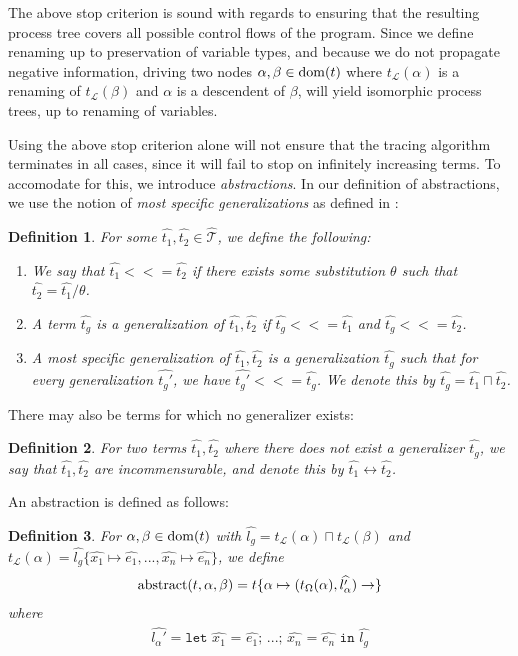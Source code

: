 \documentclass[10pt]{../sigplanconf}
\newcommand{\dom}{\ensuremath{{\rm dom}}}
\newtheorem{definition}{Definition}
\begin{document}
The above stop criterion is sound with regards to ensuring that the
resulting process tree covers all possible control flows of the
program. Since we define renaming up to preservation of variable
types, and because we do not propagate negative information, driving
two nodes $\alpha, \beta \in \dom(t)$ where $t_\mathcal{L}(\alpha)$ is
a renaming of $t_\mathcal{L}(\beta)$ and $\alpha$ is a descendent of
$\beta$, will yield isomorphic process trees, up to renaming of
variables.

Using the above stop criterion alone will not ensure that the tracing
algorithm terminates in all cases, since it will fail to stop on
infinitely increasing terms. To accomodate for this, we introduce
\emph{abstractions}. In our definition of abstractions, we use the
notion of \emph{most specific generalizations} as defined in
\cite{sorensen1998introduction}:
\begin{definition}
  For some $\widehat{t_1},\widehat{t_2} \in \widehat{\mathcal{T}}$, we
  define the following:
  \begin{enumerate}
  \item We say that $\widehat{t_1} <<= \widehat{t_2}$ if there exists
    some substitution $\theta$ such that $\widehat{t_2} =
    \widehat{t_1}/\theta$.
  \item A term $\widehat{t_g}$ is a \emph{generalization} of
    $\widehat{t_1},\widehat{t_2}$ if $\widehat{t_g} <<= \widehat{t_1}$
    and $\widehat{t_g} <<= \widehat{t_2}$.
  \item A \emph{most specific generalization} of $\widehat{t_1},
    \widehat{t_2}$ is a generalization $\widehat{t_g}$ such that for
    every generalization $\widehat{t_g'}$, we have $\widehat{t_g'} <<=
    \widehat{t_g}$. We denote this by $\widehat{t_g} = \widehat{t_1}
    \sqcap \widehat{t_2}$.
  \end{enumerate}
\end{definition}
There may also be terms for which no generalizer exists:
\begin{definition}
  For two terms $\widehat{t_1},\widehat{t_2}$ where there does not
  exist a generalizer $\widehat{t_g}$, we say that
  $\widehat{t_1},\widehat{t_2}$ are \emph{incommensurable}, and denote
  this by $\widehat{t_1} \leftrightarrow \widehat{t_2}$.
\end{definition}
An abstraction is defined as follows:
\begin{definition}
  For $\alpha, \beta \in \dom(t)$ with $\widehat{l_g} =
  t_\mathcal{L}(\alpha) \sqcap t_\mathcal{L}(\beta)$ and
  $t_\mathcal{L}(\alpha) = \widehat{l_g} \{ \widehat{x_1} \mapsto
  \widehat{e_1}, ..., \widehat{x_n} \mapsto \widehat{e_n} \}$, we
  define
\begin{align*}
{\rm abstract}(t,\alpha,\beta) = t \{ \alpha \mapsto (t_\Omega(\alpha), \widehat{l_\alpha'})\rightarrow \}
\end{align*}
where
\begin{align*}
\widehat{l_\alpha'} = \texttt{let $\widehat{x_1}$ = $\widehat{e_1}$; $...$; $\widehat{x_n}$ = $\widehat{e_n}$ in $\widehat{l_g}$}
\end{align*}
\end{definition}
\end{document}
